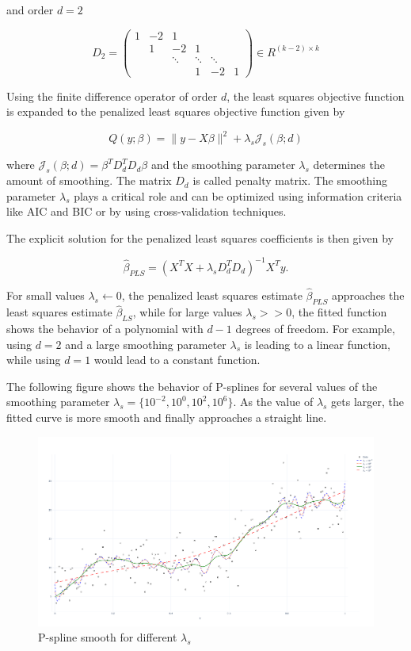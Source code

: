 \documentclass[10pt,a4paper]{article}
\begin{document}
	and order $d=2$
	
	$$D_2 = \begin{pmatrix} 1& -2& 1& &    \\  & 1 & -2 & 1&  \\  &  & \ddots & \ddots  & \ddots \\ & & & 1 & -2 & 1 \end{pmatrix} \in R^{(k-2)\times k}$$
	
	Using the finite difference operator of order $d$, the least squares objective function is expanded to the penalized least squares objective function given by
	
	$$Q(y; \beta) = \lVert y - X\beta \rVert^2 + \lambda_s \mathcal J_s(\beta; d)$$
	
	where $\mathcal J_s(\beta; d) = \beta^T D_d^T D_d \beta$ and the smoothing parameter $\lambda_s$ determines the amount of smoothing. The matrix $D_d$ is called penalty matrix. The smoothing parameter $\lambda_s$ plays a critical role and can be optimized using information criteria like AIC and BIC or by using cross-validation techniques. 
	
	The explicit solution for the penalized least squares coefficients is then given by
	
	$$\hat \beta_{PLS} = (X^TX + \lambda_s D_d^TD_d)^{-1} X^T y.$$
	
	For small values $\lambda_s \leftarrow 0$, the penalized least squares estimate $\hat \beta_{PLS}$ approaches the least squares estimate $\hat \beta_{LS}$, while for large values $\lambda_s >> 0$, the fitted function shows the behavior of a polynomial with $d-1$ degrees of freedom. For example, using $d=2$ and a large smoothing parameter $\lambda_s$ is leading to a linear function, while using $d=1$ would lead to a constant function.
	
	The following figure shows the behavior of P-splines for several values of the smoothing parameter $\lambda_s = \{10^{-2}, 10^{0},10^{2},10^{6}\}.$  As the value of $\lambda_s$ gets larger, the fitted curve is more smooth and finally approaches a straight line.
	
	
	
	\begin{figure}[H]
		\centering
		\includegraphics[width=\linewidth]{thesisplots/p_splines.pdf}
		\caption{P-spline smooth for different $\lambda_s$}
		\label{fig:pspline}
	\end{figure}
			
\end{document}
